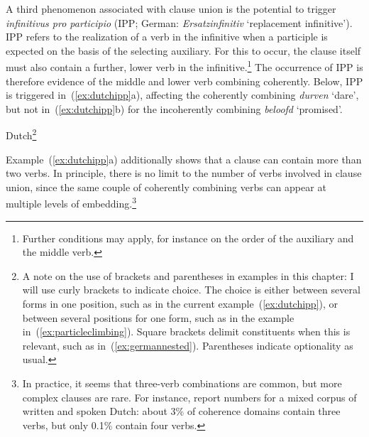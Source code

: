 \documentclass[output=paper,hidelinks]{langscibook}
\begin{document}
A third phenomenon associated with clause union is the potential to trigger
\textit{infinitivus pro participio} (IPP; German:
\textit{Ersatzinfinitiv} `replacement infinitive'). IPP refers to the
realization of a verb in the infinitive when a participle is expected
on the basis of the selecting auxiliary. For this to occur, the clause itself
must also contain a further, lower verb in the
infinitive.\footnote{Further conditions may apply, for instance on the
order of the auxiliary and the middle verb.} The occurrence of IPP is
therefore evidence of the middle and lower verb combining
coherently. Below, IPP is triggered in~(\ref{ex:dutchipp}a), affecting the
coherently combining \textit{durven} `dare', but not in~(\ref{ex:dutchipp}b) for
the incoherently combining \textit{beloofd} `promised'.
%
\begin{exe}
  \ex \label{ex:dutchipp}Dutch\footnote{A note on the use of brackets and parentheses in examples in this chapter: I will use curly brackets to indicate choice. The choice is either between several forms in one position, such as in the current example~(\ref{ex:dutchipp}), or between several positions for one form, such as in the example in~(\ref{ex:particleclimbing}). Square brackets delimit constituents when this is relevant, such as in~(\ref{ex:germannested}). Parentheses indicate optionality as usual.}
  \begin{xlist}
  \end{xlist}
\end{exe}
%
Example~(\ref{ex:dutchipp}a) additionally shows that a clause can contain more
than two verbs. In principle, there is no limit to the number of verbs 
involved in clause union, since the same couple of coherently
combining verbs can appear at multiple levels of
embedding.\footnote{In practice, it seems that three-verb combinations are common, but more complex clauses are rare. For instance, \citet{cousse-bouma:2022} report numbers for a mixed corpus of written and spoken Dutch: about 3\% of coherence domains contain three verbs, but only 0.1\% contain four verbs.}
\end{document}
